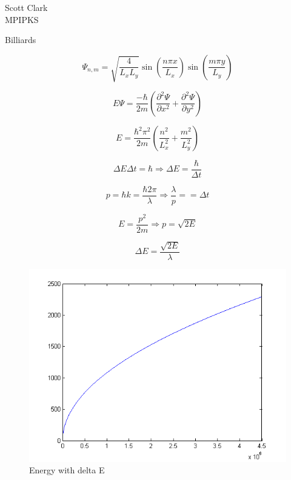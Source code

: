 \documentclass[12pt]{article}
\begin{document}
\begin{flushleft}
Scott Clark \\
MPIPKS
\end{flushleft}

Billiards

\[\Psi_{n,m} = \sqrt{\frac{4}{L_{x}L_{y}}} \sin \left(\frac{n \pi x}{L_{x}} \right) \sin \left(\frac{m \pi y}{L_{y}} \right)\]

\[E \Psi = \frac{- \hbar}{2 m} \left( \frac{\partial^{2} \Psi}{\partial x^{2}} + \frac{\partial^{2} \Psi}{\partial y^{2}} \right)\]

\[E = \frac{\hbar^{2} \pi^{2}}{2 m} \left( \frac{n^{2}}{L_{x}^{2}} + \frac{m^{2}}{L_{y}^{2}} \right)\]

\[\Delta E \Delta t = \hbar \Rightarrow \Delta E = \frac{ \hbar}{\Delta t}\]

\[p = \hbar k = \frac{\hbar 2 \pi}{\lambda} \Rightarrow \frac{\lambda}{p} =  = \Delta t\]

\[E = \frac{p^{2}}{2m} \Rightarrow p = \sqrt{2E}\]

\[\Delta E = \frac{ \sqrt{2E}}{\lambda}\]

\begin{figure}[hpt]
	\centering
		\includegraphics[width=1.00\textwidth]{notes2/EvsDelE.png}
	\caption{Energy with delta E}
	\label{fig:energywdeltaerrors}
\end{figure}
\end{document}
